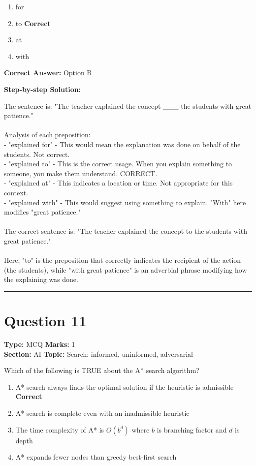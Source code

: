 \documentclass[11pt]{article}
\begin{document}
\begin{enumerate}[label=\textbf{\Alph*.}, leftmargin=1.8em]
\item for\item to \hfill {\color{gategreen}\textbf{Correct}}\item at\item with\end{enumerate}

\textbf{Correct Answer:} Option B

\textbf{Step-by-step Solution:}

The sentence is: "The teacher explained the concept \_\_\_ the students with great patience."\\
\\
 Analysis of each preposition:\\
 - "explained for" - This would mean the explanation was done on behalf of the students. Not correct.\\
 - "explained to" - This is the correct usage. When you explain something to someone, you make them understand. CORRECT.\\
 - "explained at" - This indicates a location or time. Not appropriate for this context.\\
 - "explained with" - This would suggest using something to explain. "With" here modifies "great patience."\\
\\
 The correct sentence is: "The teacher explained the concept to the students with great patience."\\
\\
 Here, "to" is the preposition that correctly indicates the recipient of the action (the students), while "with great patience" is an adverbial phrase modifying how the explaining was done.

\vspace{0.8em}
\hrule
\vspace{0.4em}
\section*{Question 11}
\textbf{Type:} MCQ \hfill \textbf{Marks:} 1\\
\textbf{Section:} AI \hfill \textbf{Topic:} Search: informed, uninformed, adversarial

Which of the following is TRUE about the A* search algorithm?


\begin{enumerate}[label=\textbf{\Alph*.}, leftmargin=1.8em]
\item A* search always finds the optimal solution if the heuristic is admissible \hfill {\color{gategreen}\textbf{Correct}}\item A* search is complete even with an inadmissible heuristic\item The time complexity of A* is \(O(b^d)\) where \(b\) is branching factor and \(d\) is depth\item A* expands fewer nodes than greedy best-first search\end{enumerate}
\end{document}
